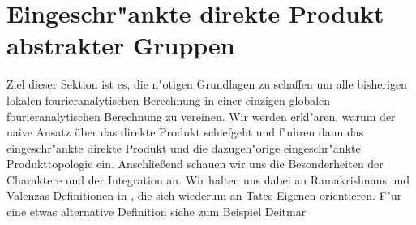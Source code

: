 \section{Eingeschr"ankte direkte Produkt abstrakter Gruppen}
	Ziel dieser Sektion ist es, die n"otigen Grundlagen zu schaffen um alle bisherigen lokalen fourieranalytischen Berechnung in einer einzigen globalen fourieranalytischen Berechnung zu vereinen. 
	Wir werden erkl"aren, warum der naive Ansatz über das direkte Produkt schiefgeht und f"uhren dann das eingeschr"ankte direkte Produkt und die dazugeh"orige eingeschr"ankte Produkttopologie ein.
	Anschließend schauen wir uns die Besonderheiten der Charaktere und der Integration an. 
	Wir halten uns dabei an Ramakrishnans und Valenzas Definitionen in \cite{rama}, die sich wiederum an Tates Eigenen orientieren.
	F"ur eine etwas alternative Definition siehe zum Beispiel Deitmar \cite{deitmar2010}
